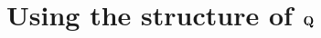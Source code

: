 \documentclass[12pt]{article} %
\newtheorem{remark}{Remark}
\begin{document}
%
%






\section{Using the structure of $\mathbf{Q}$}
\end{document}
